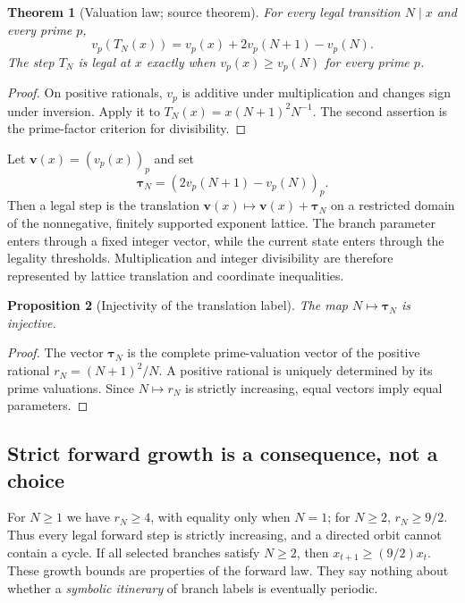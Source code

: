 \documentclass[11pt,a4paper]{article}
\newtheorem{theorem}{Theorem}[section]
\newtheorem{proposition}[theorem]{Proposition}
\theoremstyle{definition}\newtheorem{definition}[theorem]{Definition}
\begin{document}
\begin{theorem}[Valuation law; source theorem]\label{thm:valuation}
For every legal transition $N\mid x$ and every prime $p$,
\begin{equation}\label{eq:valuation}
v_p(T_N(x))=v_p(x)+2v_p(N+1)-v_p(N).
\end{equation}
The step $T_N$ is legal at $x$ exactly when $v_p(x)\ge v_p(N)$ for every prime $p$.
\end{theorem}
\begin{proof}
On positive rationals, $v_p$ is additive under multiplication and changes sign under inversion. Apply it to $T_N(x)=x(N+1)^2N^{-1}$. The second assertion is the prime-factor criterion for divisibility.
\end{proof}

Let $\mathbf v(x)=(v_p(x))_p$ and set
\begin{equation}\label{eq:tau}
\boldsymbol\tau_N=(2v_p(N+1)-v_p(N))_p.
\end{equation}
Then a legal step is the translation $\mathbf v(x)\mapsto\mathbf v(x)+\boldsymbol\tau_N$ on a restricted domain of the nonnegative, finitely supported exponent lattice. The branch parameter enters through a fixed integer vector, while the current state enters through the legality thresholds. Multiplication and integer divisibility are therefore represented by lattice translation and coordinate inequalities.

\begin{proposition}[Injectivity of the translation label]
The map $N\mapsto\boldsymbol\tau_N$ is injective.
\end{proposition}
\begin{proof}
The vector $\boldsymbol\tau_N$ is the complete prime-valuation vector of the positive rational $r_N=(N+1)^2/N$. A positive rational is uniquely determined by its prime valuations. Since $N\mapsto r_N$ is strictly increasing, equal vectors imply equal parameters.
\end{proof}

\subsection{Strict forward growth is a consequence, not a choice}
For $N\ge1$ we have $r_N\ge4$, with equality only when $N=1$; for $N\ge2$, $r_N\ge9/2$. Thus every legal forward step is strictly increasing, and a directed orbit cannot contain a cycle. If all selected branches satisfy $N\ge2$, then $x_{t+1}\ge(9/2)x_t$. These growth bounds are properties of the forward law. They say nothing about whether a \emph{symbolic itinerary} of branch labels is eventually periodic.
\end{document}
